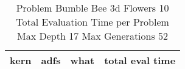 \begin{table}[H]
\caption{Problem  Bumble Bee 3d  Flowers 10\\Total Evaluation Time per Problem \\ Max Depth 17 Max Generations 52\\}
\begin{center}
\scalebox{1.0} %
{
\begin{tabular}{lllr}
\hline
kern & adfs & what & total eval time \\
\hline


\end{tabular}
}
\end{center}
\end{table}

